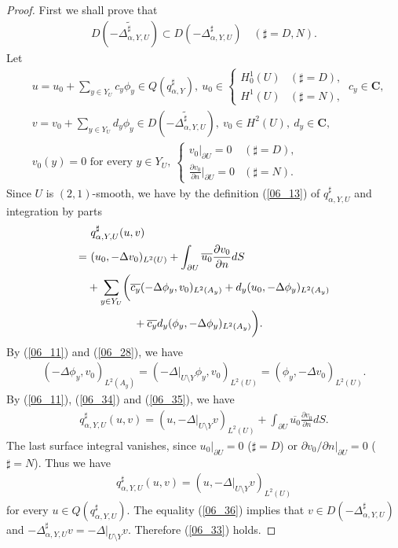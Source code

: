\documentclass[12pt,a4paper]{article}
\begin{document}
\begin{proof}
First we shall prove that
\begin{align}
D(\widetilde{-\Delta^\sharp_{\alpha,Y,U}})\subset 
D(-\Delta^\sharp_{\alpha,Y,U})\quad
(\sharp=D,N).
\label{06_33}
\end{align}
Let
\begin{align*}
&u=u_0+\sum_{y\in Y_U}c_y \phi_y\in Q(q^\sharp_{\alpha,Y}),
\ u_0\in 
\begin{cases}
H^1_0(U) & (\sharp=D),\\
H^1(U) & (\sharp=N),
\end{cases}\ 
c_y\in \mathbf{C},\\
&v=v_0+\sum_{y\in Y_U}d_y \phi_y\in D(\widetilde{-\Delta^\sharp_{\alpha,Y,U}}),\ 
v_0\in H^2(U),\ d_y\in \mathbf{C},\\
& v_0(y)=0\mbox{ for every $y\in Y_U$},\ 
\begin{cases}
 v_0|_{\partial U}=0 & (\sharp=D),\\
\frac{\partial v_0}{\partial n}|_{\partial U}=0 & (\sharp=N).
\end{cases}
\end{align*}
Since $U$ is $(2,1)$-smooth, we have
by the definition (\ref{06_13}) of $q^\sharp_{\alpha,Y,U}$
and integration by parts
\begin{align}
&\  q^\sharp_{\alpha,Y,U}(u,v)\notag\\
=&\ 
(u_0,-\Delta v_0)_{L^2(U)} +\int_{\partial U}\overline{u_0}\frac{\partial v_0}{\partial n}dS\notag\\
&+\sum_{y\in Y_U}
\biggl(
\overline{c_y}(-\Delta \phi_y, v_0)_{L^2(A_y)}
+
d_y(u_0,-\Delta \phi_y)_{L^2(A_y)}\notag\\
&
\hspace{1.5cm}
+\overline{c_y}d_y(\phi_y,-\Delta \phi_y)_{L^2(A_y)}
\biggr).
\label{06_34}
\end{align}
By (\ref{06_11}) and (\ref{06_28}), we have
\begin{align}
 (-\Delta \phi_y,v_0)_{L^2(A_y)}
=
 (-\Delta|_{U\setminus Y} \phi_y,v_0)_{L^2(U)}
=
 (\phi_y,-\Delta v_0)_{L^2(U)}.
\label{06_35}
\end{align}
By (\ref{06_11}), (\ref{06_34}) and (\ref{06_35}), we have
\begin{align*}
 q^\sharp_{\alpha,Y,U}(u,v)
=
(u,-\Delta|_{U\setminus Y}v)_{L^2(U)}
+\int_{\partial U}\overline{u_0}\frac{\partial v_0}{\partial n}dS.
\end{align*}
The last surface integral vanishes,
since $u_0|_{\partial U}=0$ ($\sharp=D$) or
$\partial v_0/\partial n|_{\partial U}=0$ ($\sharp=N$).
Thus we have
\begin{align}
 q^\sharp_{\alpha,Y,U}(u,v)=
(u,-\Delta|_{U\setminus Y}v)_{L^2(U)}
\label{06_36}
\end{align}
for every $u\in Q(q^\sharp_{\alpha,Y,U})$.
The equality (\ref{06_36}) implies that
$v\in D(-\Delta^\sharp_{\alpha,Y,U})$ and
$-\Delta^\sharp_{\alpha,Y,U}v=-\Delta|_{U\setminus Y}v$.
Therefore (\ref{06_33}) holds.


\end{proof}
\end{document}
